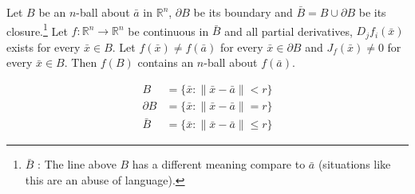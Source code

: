 \begin{theorem}
Let $B$ be an $n$-ball about $\bar{a}$ in $\mathbb{R}^n$, $\partial B$ be its boundary and $\bar{B} = B \cup \partial B$ be its closure.\footnote{$\bar{B}$ : The line above $B$ has a different meaning compare to $\bar{a}$ (situations like this are an abuse of language).}
Let $f : \mathbb{R}^n \to \mathbb{R}^n$ be continuous in $\bar{B}$ and all partial derivatives, $D_jf_i(\bar{x})$ exists for every $\bar{x} \in B$.
Let $f(\bar{x}) \ne f(\bar{a})$ for every $\bar{x} \in \partial B$ and $J_f(\bar{x}) \ne 0$ for every $\bar{x} \in B$.
Then $f(B)$ contains an $n$-ball about $f(\bar{a})$.
\begin{commentary}
	\begin{align*}
		B & = \{ \bar{x} : \| \bar{x} - \bar{a} \| < r \} \\
		\partial B & = \{ \bar{x} : \| \bar{x} - \bar{a} \| = r \} \\
		\bar{B} & = \{ \bar{x} : \| \bar{x} - \bar{a} \| \le r \} 
	\end{align*}
\end{commentary}
\end{theorem}
